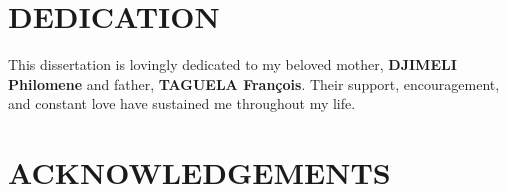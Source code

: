 \documentclass[a4paper,12pt,openany]{report}
\theoremstyle{plain}
\theoremstyle{plain}
\theoremstyle{plain}
\theoremstyle{plain}
\theoremstyle{plain}
\theoremstyle{plain}
\theoremstyle{plain}
\theoremstyle{plain}
\theoremstyle{plain}
\theoremstyle{plain}
\theoremstyle{plain}
\theoremstyle{plain}
\begin{document}
	

\chapter*{DEDICATION}

\begin{center}
		This dissertation is lovingly dedicated to my beloved mother, \textbf{DJIMELI Philomene} and father, \textbf{TAGUELA Fran\c{c}ois}. Their support, encouragement, and constant love have sustained me throughout my life.

\end{center}

\chapter*{ACKNOWLEDGEMENTS}
\noindent
\end{document}
